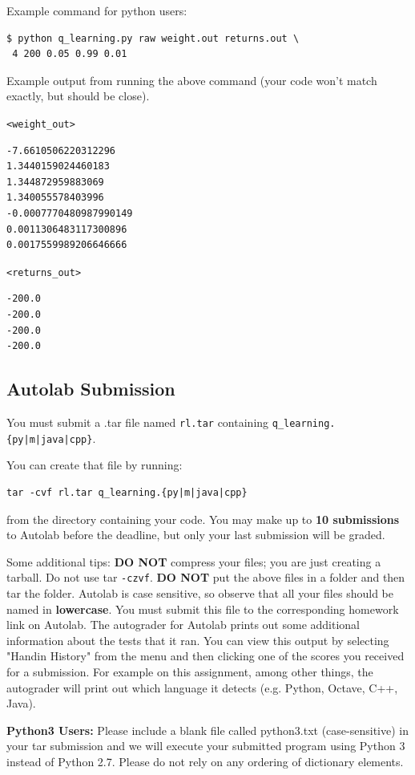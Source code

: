 Example command for python users:
\begin{lstlisting}[language=Shell]
$ python q_learning.py raw weight.out returns.out \ 
 4 200 0.05 0.99 0.01
\end{lstlisting}

Example output from running the above command (your code won't match exactly, but should be close).

\texttt{<weight\_out>}
\begin{lstlisting}
-7.6610506220312296
1.3440159024460183
1.344872959883069
1.340055578403996
-0.0007770480987990149
0.0011306483117300896
0.0017559989206646666
\end{lstlisting}

\texttt{<returns\_out>}
\begin{lstlisting}
-200.0
-200.0
-200.0
-200.0
\end{lstlisting}

\subsection{Autolab Submission}
You must submit a .tar file 
named \texttt{rl.tar} containing \texttt{q\_learning.\{py|m|java|cpp\}}.  

You can create that file by running:
\begin{lstlisting}
tar -cvf rl.tar q_learning.{py|m|java|cpp}
\end{lstlisting}
from the directory containing your code. You may make up to \textbf{10 submissions} to Autolab before the deadline, but only your last submission will be graded.

Some additional tips: {\bf DO NOT} compress your files; you are just
creating a tarball. Do not use tar \texttt{-czvf}.  {\bf DO NOT} put
the above files in a folder and then tar the folder.  Autolab is case
sensitive, so observe that all your files should be named in {\bf
  lowercase}. You must submit this file to the corresponding homework
link on Autolab. The autograder for Autolab prints out some additional 
information about the tests that it ran. You can view this output by selecting 
 "Handin History" from the menu and then clicking one of the scores you 
 received for a submission. For example on this assignment, among other things, 
 the autograder will print out which language it detects (e.g. Python, Octave, C++, Java). 
 
 \begin{notebox}
  {\bf Python3 Users:} Please include a blank file called python3.txt (case-sensitive) in your tar submission and we will execute your submitted program using Python 3 instead of Python 2.7. Please do not rely on any ordering of dictionary elements.
 \end{notebox}

